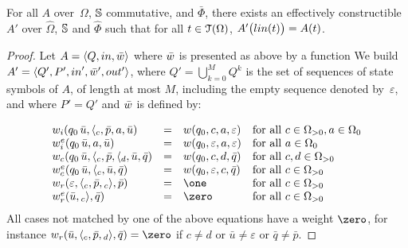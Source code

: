 \begin{proposition}\label{lem:SWTA}
For all \SWTA $A$ over~$\Omega$, $\mathbb{S}$ commutative, and $\bar\Phi$,
there exists an effectively constructible \SWVPA $A'$ over 
$\hat\Omega$, $\mathbb{S}$ and $\hat\Phi$ 
such that for all $t \in \mathcal{T}(\Omega)$, $A'\bigl(\lin(t)\bigr) = A(t)$.
\end{proposition} 
% 
\begin{proof}
Let $A = \< Q, \init, \bar{\wei} >$ where $\bar{\wei}$ is presented as above by a function
We build 
$A' = \< Q', P', \init', \bar{\wei}', \final' >$,
where $Q' = \bigcup_{k=0}^{M} Q^k$ is the set of sequences of state symbols of $A$, 
of length at most $M$, including the empty sequence denoted by~$\varepsilon$, 
and where $P' = Q'$ and $\bar\wei$ is defined by:

\[
\begin{array}{lcll}
\weii(q_0\, \bar{u}, {\call{c}}, \bar{p}, a, \bar{u}) & = & \wei(q_0, c, a, \varepsilon) & 
\mathrm{for~all~} c \in \Omega_{>0}, a \in \Omega_0\\ %
%
\weiei(q_0\,\bar{u}, a, \bar{u}) & = & \wei(q_0, \varepsilon, a, \varepsilon) & 
\mathrm{for~all~} a \in \Omega_0\\
%
\weic(q_0\,\bar{u}, {\call{c}}, \bar{p}, \call{d}, \bar{u}, \bar{q}) & = & \wei(q_0, c, d, \bar{q}) &  
\mathrm{for~all~} c, d \in \Omega_{>0}\\ %
%
\weiec(q_0\,\bar{u}, \call{c}, \bar{u}, \bar{q}) & = & \wei(q_0, \varepsilon, c, \bar{q}) & 
\mathrm{for~all~} c \in \Omega_{>0}\\
%
\weir(\varepsilon, {\call{c}}, \bar{p}, {\return{c}}, \bar{p}) & = & \one & 
\mathrm{for~all~}  c \in \Omega_{>0}\\ %
%
\weier(\bar{u}, {\return{c}}, \bar{q}) & = & \zero &
\mathrm{for~all~}  c \in \Omega_{>0}
\end{array}      
\]
\noindent
All cases not matched by one of the above equations have a weight $\zero$, 
for instance  %
$\weir(\bar{u}, {\call{c}}, \bar{p}, {\return{d}}, \bar{q}) = \zero$
if $c \neq d$
or $\bar{u} \neq \varepsilon$
or $\bar{q} \neq \bar{p}$.
%
\end{proof}




\newpage
\listoftodos





